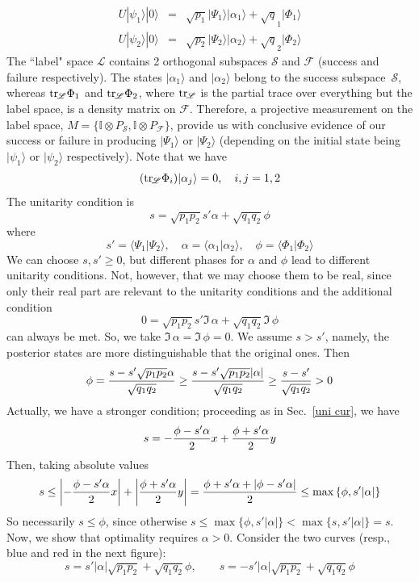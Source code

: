 \documentclass[a4]{article}
\newcommand{\tr}{{\rm tr}\,}
\begin{document}
%
\begin{eqnarray*}
U|\psi_1\rangle|0\rangle&=& \sqrt{p_1}|\Psi_1\rangle|\alpha_1\rangle +\sqrt q_1 |\Phi_1\rangle\\
U|\psi_2\rangle|0\rangle&=& \sqrt{p_2}|\Psi_2\rangle|\alpha_2\rangle +\sqrt q_2 |\Phi_2\rangle
\end{eqnarray*}
%
The ``label" space $\mathscr L$ contains 2 orthogonal subspaces $\mathscr S$ and $\mathscr F$ (success and failure respectively). The states $|\alpha_1\rangle$ and $|\alpha_2\rangle$ belong to the success subspace~$\mathscr S$, whereas $\tr_{\!\!\mathscr L}\Phi_1$ and $\tr_{\!\!\mathscr L}\Phi_2$, where  $\tr_{\!\!\mathscr L}$ is the partial trace over everything but the label space, is a density matrix on $\mathscr F$. Therefore, a projective measurement on the label space, $M=\{{\mathbb I}\otimes P_{\mathscr S},{\mathbb I}\otimes P_{\mathscr F}\}$, provide us with conclusive evidence of our success or failure in producing $|\Psi_1\rangle$ or $|\Psi_2\rangle$ (depending on the initial state being $|\psi_1\rangle$ or $|\psi_2\rangle$ respectively). Note that we have
$$
(\tr_{\!\!\mathscr L}\Phi_i)|\alpha_j\rangle=0,\quad i,j=1,2
$$
The unitarity condition is
$$
s=\sqrt{p_1 p_2} s' \alpha+\sqrt{q_1 q_2}\phi
$$
where
$$
s'=\langle\Psi_1|\Psi_2\rangle,\quad \alpha=\langle\alpha_1|\alpha_2\rangle,\quad \phi=\langle\Phi_1|\Phi_2\rangle
$$
We can choose $s,s'\ge0$, but different phases for $\alpha$ and $\phi$ lead to different unitarity conditions. Not, however, that we may choose them to be real, since only their real part are relevant to the unitarity conditions and the additional condition
$$
0=\sqrt{p_1p_2}s' \Im\,\alpha+\sqrt{q_1q_2}\Im\,\phi
$$
can always be met. So, we take $ \Im\,\alpha=\Im\,\phi=0$.
We assume $s>s'$, namely, the posterior states are more distinguishable that the original ones. Then
$$
\phi={s-s'\sqrt{p_1p_2}\alpha\over\sqrt{q_1q_2}}\ge {s-s'\sqrt{p_1p_2}|\alpha|\over\sqrt{q_1q_2}}\ge {s-s'\over\sqrt{q_1q_2}}>0
$$
Actually, we have a stronger condition; proceeding as in Sec.~\ref{uni cur}, we have
$$
s=-{\phi-s'\alpha\over2}x+{\phi+s'\alpha\over2}y
$$
Then, taking absolute values
$$
s\le\left|-{\phi-s'\alpha\over2}x\right|+\left|{\phi+s'\alpha\over2}y\right|={\phi+s'\alpha+|\phi-s'\alpha|\over2}\le\max\left\{\phi,s'|\alpha|\right\}
$$
So necessarily $s\le\phi$, since otherwise $s\le \max\{\phi,s'|\alpha|\}<\max\{s,s'|\alpha|\}=s$. Now, we show that optimality requires $\alpha>0$. Consider the two curves (resp., blue and red in the next figure):
$$
s=s'|\alpha| \sqrt{p_1p_2}+\sqrt{q_1q_2}\phi,\qquad s=-s'|\alpha| \sqrt{p_1p_2} +\sqrt{q_1q_2}\phi
$$
\end{document}

